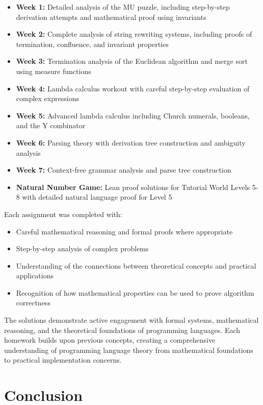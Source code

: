 \documentclass{article}
\theoremstyle{plain}
\theoremstyle{definition}
\theoremstyle{remark}
\begin{document}
\begin{itemize}
\item \textbf{Week 1:} Detailed analysis of the MU puzzle, including step-by-step derivation attempts and mathematical proof using invariants
\item \textbf{Week 2:} Complete analysis of string rewriting systems, including proofs of termination, confluence, and invariant properties
\item \textbf{Week 3:} Termination analysis of the Euclidean algorithm and merge sort using measure functions
\item \textbf{Week 4:} Lambda calculus workout with careful step-by-step evaluation of complex expressions
\item \textbf{Week 5:} Advanced lambda calculus including Church numerals, booleans, and the Y combinator
\item \textbf{Week 6:} Parsing theory with derivation tree construction and ambiguity analysis
\item \textbf{Week 7:} Context-free grammar analysis and parse tree construction
\item \textbf{Natural Number Game:} Lean proof solutions for Tutorial World Levels 5-8 with detailed natural language proof for Level 5
\end{itemize}

Each assignment was completed with:
\begin{itemize}
\item Careful mathematical reasoning and formal proofs where appropriate
\item Step-by-step analysis of complex problems
\item Understanding of the connections between theoretical concepts and practical applications
\item Recognition of how mathematical properties can be used to prove algorithm correctness
\end{itemize}

The solutions demonstrate active engagement with formal systems, mathematical reasoning, and the theoretical foundations of programming languages. Each homework builds upon previous concepts, creating a comprehensive understanding of programming language theory from mathematical foundations to practical implementation concerns.

\section{Conclusion}\label{conclusion}
\end{document}
